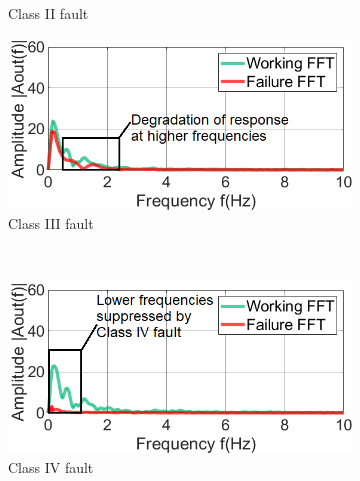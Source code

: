 \begin{figure}
\begin{subfigure}[t]{0.33\textwidth}
		\caption{Class II fault}
		\label{fig:classII_fault_freq}
	\end{subfigure}
	\begin{subfigure}[t]{0.325\textwidth}
		\centering
		\includegraphics[width=\textwidth]{figures/2-PIR-Fault/normal-classIII/class3_fft_coloradj_small_edited_camera_ready.png}
		\caption{Class III fault}
		\label{fig:classIII_fault_freq}
	\end{subfigure}\\
	\begin{subfigure}[t]{0.33\linewidth}
		\centering
		\includegraphics[width=\linewidth]{figures/2-PIR-Fault/normal-classIV/class4_fft_coloradj_small_edited_camera_ready.png}
		\caption{Class IV fault}
		\label{fig:classIV_fault_freq}
	\end{subfigure}
	\begin{subfigure}[t]{0.33\linewidth}
		\centering

\end{subfigure}
\end{figure}
